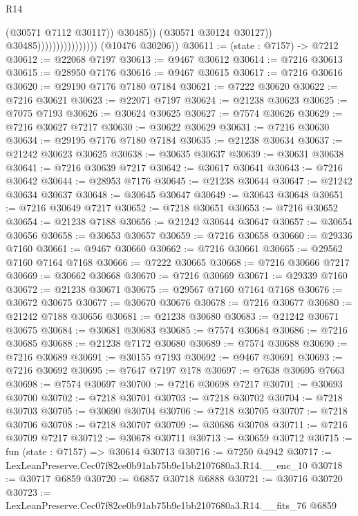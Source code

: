 \begin{lexlean}{R14}
\begin{coremodule}
                                              (@30571 @7112 @30117))
                                            @30485))
                                        (@30571 @30124 @30127))
                                      @30485))))))))))))))))
      (@10476 @30206))
@30611 := (state : @7157) -> @7212
@30612 := @22068 @7197
@30613 := @9467 @30612
@30614 := @7216 @30613
@30615 := @28950 @7176
@30616 := @9467 @30615
@30617 := @7216 @30616
@30620 := @29190 @7176 @7180 @7184
@30621 := @7222 @30620
@30622 := @7216 @30621
@30623 := @22071 @7197
@30624 := @21238 @30623
@30625 := @7075 @7193
@30626 := @30624 @30625
@30627 := @7574 @30626
@30629 := @7216 @30627 @7217
@30630 := @30622 @30629
@30631 := @7216 @30630
@30634 := @29195 @7176 @7180 @7184
@30635 := @21238 @30634
@30637 := @21242 @30623 @30625
@30638 := @30635 @30637
@30639 := @30631 @30638
@30641 := @7216 @30639 @7217
@30642 := @30617 @30641
@30643 := @7216 @30642
@30644 := @28953 @7176
@30645 := @21238 @30644
@30647 := @21242 @30634 @30637
@30648 := @30645 @30647
@30649 := @30643 @30648
@30651 := @7216 @30649 @7217
@30652 := @7218 @30651
@30653 := @7216 @30652
@30654 := @21238 @7188
@30656 := @21242 @30644 @30647
@30657 := @30654 @30656
@30658 := @30653 @30657
@30659 := @7216 @30658
@30660 := @29336 @7160
@30661 := @9467 @30660
@30662 := @7216 @30661
@30665 := @29562 @7160 @7164 @7168
@30666 := @7222 @30665
@30668 := @7216 @30666 @7217
@30669 := @30662 @30668
@30670 := @7216 @30669
@30671 := @29339 @7160
@30672 := @21238 @30671
@30675 := @29567 @7160 @7164 @7168
@30676 := @30672 @30675
@30677 := @30670 @30676
@30678 := @7216 @30677
@30680 := @21242 @7188 @30656
@30681 := @21238 @30680
@30683 := @21242 @30671 @30675
@30684 := @30681 @30683
@30685 := @7574 @30684
@30686 := @7216 @30685
@30688 := @21238 @7172 @30680
@30689 := @7574 @30688
@30690 := @7216 @30689
@30691 := @30155 @7193
@30692 := @9467 @30691
@30693 := @7216 @30692
@30695 := @7647 @7197 @178
@30697 := @7638 @30695 @7663
@30698 := @7574 @30697
@30700 := @7216 @30698 @7217
@30701 := @30693 @30700
@30702 := @7218 @30701
@30703 := @7218 @30702
@30704 := @7218 @30703
@30705 := @30690 @30704
@30706 := @7218 @30705
@30707 := @7218 @30706
@30708 := @7218 @30707
@30709 := @30686 @30708
@30711 := @7216 @30709 @7217
@30712 := @30678 @30711
@30713 := @30659 @30712
@30715 := fun (state : @7157) => @30614 @30713
@30716 := @7250 @4942
@30717 := LexLeanPreserve.Cec07f82ce0b91ab75b9e1bb2107680a3.R14.__enc_10
@30718 := @30717 @6859
@30720 := @6857 @30718 @6888
@30721 := @30716 @30720
@30723 := LexLeanPreserve.Cec07f82ce0b91ab75b9e1bb2107680a3.R14.__fits_76 @6859

\end{coremodule}
\end{lexlean}
